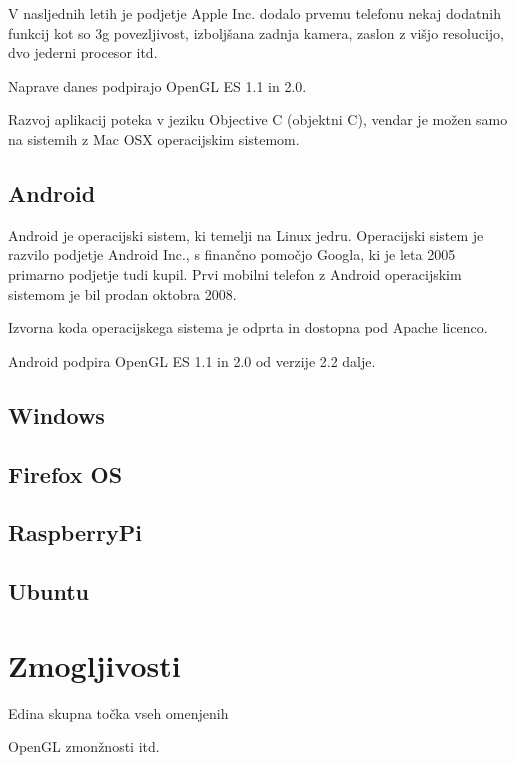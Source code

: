 V nasljednih letih je podjetje Apple Inc. dodalo prvemu telefonu nekaj dodatnih funkcij kot so 3g povezljivost, izboljšana zadnja kamera, zaslon z višjo resolucijo, dvo jederni procesor itd.

Naprave danes podpirajo OpenGL ES 1.1 in 2.0.

Razvoj aplikacij poteka v jeziku Objective C (objektni C), vendar je možen samo na sistemih z Mac OSX operacijskim sistemom.

\subsection{Android}

Android je operacijski sistem, ki temelji na Linux jedru. Operacijski sistem je razvilo podjetje Android Inc., s finančno pomočjo Googla, ki je leta 2005 primarno podjetje tudi kupil. Prvi mobilni telefon z Android operacijskim sistemom je bil prodan oktobra 2008.

Izvorna koda operacijskega sistema je odprta in dostopna pod Apache licenco.

Android podpira OpenGL ES 1.1 in 2.0 od verzije 2.2 dalje.
\subsection{Windows}
\subsection{Firefox OS}
\subsection{RaspberryPi}
\subsection{Ubuntu}

\section{Zmogljivosti}

Edina skupna točka vseh omenjenih 

OpenGL zmonžnosti itd.





